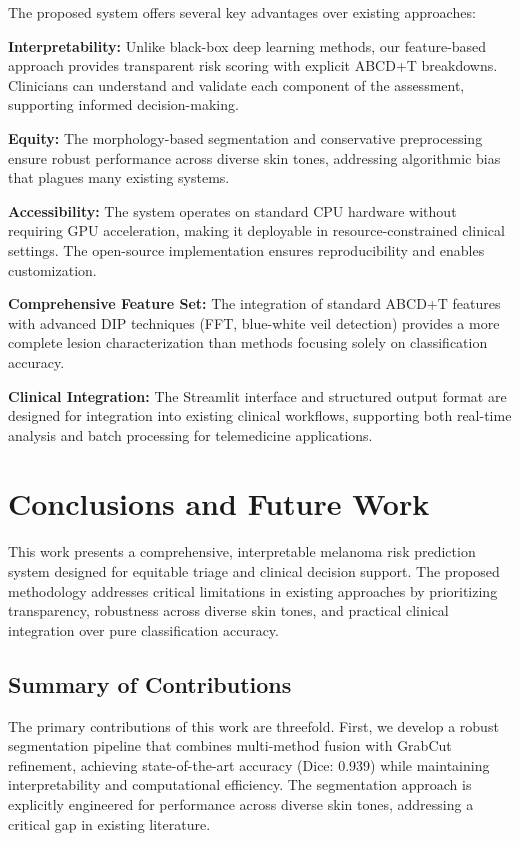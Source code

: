 \documentclass[conference]{IEEEtran}
\begin{document}
The proposed system offers several key advantages over existing approaches:

\textbf{Interpretability:} Unlike black-box deep learning methods, our feature-based approach provides transparent risk scoring with explicit ABCD+T breakdowns. Clinicians can understand and validate each component of the assessment, supporting informed decision-making.

\textbf{Equity:} The morphology-based segmentation and conservative preprocessing ensure robust performance across diverse skin tones, addressing algorithmic bias that plagues many existing systems.

\textbf{Accessibility:} The system operates on standard CPU hardware without requiring GPU acceleration, making it deployable in resource-constrained clinical settings. The open-source implementation ensures reproducibility and enables customization.

\textbf{Comprehensive Feature Set:} The integration of standard ABCD+T features with advanced DIP techniques (FFT, blue-white veil detection) provides a more complete lesion characterization than methods focusing solely on classification accuracy.

\textbf{Clinical Integration:} The Streamlit interface and structured output format are designed for integration into existing clinical workflows, supporting both real-time analysis and batch processing for telemedicine applications.

\section{Conclusions and Future Work}

This work presents a comprehensive, interpretable melanoma risk prediction system designed for equitable triage and clinical decision support. The proposed methodology addresses critical limitations in existing approaches by prioritizing transparency, robustness across diverse skin tones, and practical clinical integration over pure classification accuracy.

\subsection{Summary of Contributions}

The primary contributions of this work are threefold. First, we develop a robust segmentation pipeline that combines multi-method fusion with GrabCut refinement, achieving state-of-the-art accuracy (Dice: 0.939) while maintaining interpretability and computational efficiency. The segmentation approach is explicitly engineered for performance across diverse skin tones, addressing a critical gap in existing literature.
\end{document}
